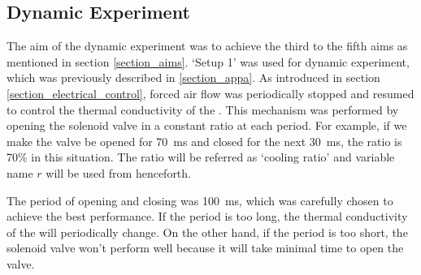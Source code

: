 \subsection{Dynamic Experiment}\label{section_dynamic} %
The aim of the dynamic experiment was to achieve the third to the fifth aims as mentioned in section \ref{section_aims}.
%
%
`Setup 1' was used for dynamic experiment, which was previously described in \ref{section_appa}. %
%
%
As introduced in section \ref{section_electrical_control}, forced air flow was periodically stopped and resumed to control the thermal conductivity of the \scpnospace.
This mechanism was performed by opening the solenoid valve in a constant ratio at each period. For example, if we make the valve be opened for \SI{70}{\milli\second} and closed for the next \SI{30}{\milli\second}, the ratio is 70\% in this situation. 
The ratio will be referred as `cooling ratio' and variable name $r$ will be used from henceforth.

%

The period of opening and closing was \SI{100}{\milli\second}, which was carefully chosen to achieve the best performance. If the period is too long, the thermal conductivity of the \scps will periodically change. On the other hand, if the period is too short, the solenoid valve won't perform well because it will take minimal time to open the valve. 

